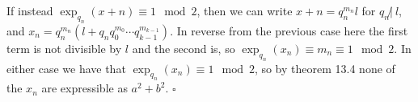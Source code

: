 \documentclass[letterpaper, reqno,11pt]{article}
\begin{document}
If instead $\exp_{q_{n}}(x+n)\equiv 1\mod 2$, then we can write $x+n=q_n^{m_n}l$ for $q_n\not |\ l$, and $x_n=q_n^{m_n}(l+q_nq_0^{m_0}\cdots q_{k-1}^{m_{k-1}})$. In reverse from the previous case here the first term is not divisible by $l$ and the second is, so $\exp_{q_n}(x_n)\equiv m_n\equiv 1\mod 2$. In either case we have that $\exp_{q_n}(x_n)\equiv 1\mod 2$, so by theorem 13.4 none of the $x_n$ are expressible as $a^2+b^2$. $\square$
\end{document}
